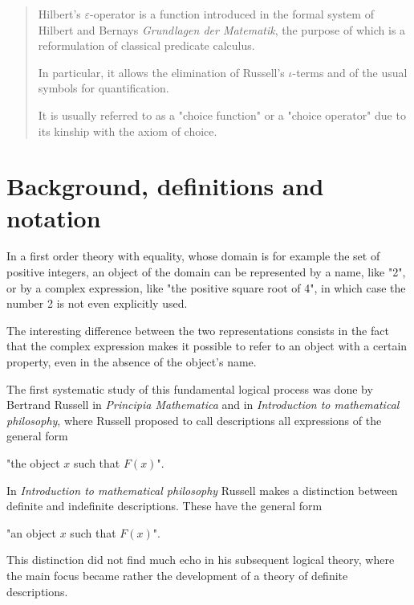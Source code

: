 \documentclass[12pt]{article}
\begin{document}
\begin{abstract}
Hilbert's $\varepsilon$-operator is a function introduced in the formal system of Hilbert and Bernays \emph{Grundlagen der Matematik}, the purpose of which is a reformulation of classical predicate calculus.

In particular, it allows the elimination of Russell's $\iota$-terms and of the usual symbols for quantification.

It is usually referred to as a "choice function" or a "choice operator" due to its kinship with the axiom of choice.
\end{abstract}

\tableofcontents

\section{Background, definitions and notation}\normalsize

In a first order theory with equality, whose domain is for example the set of positive integers, an object of the domain can be represented by a name, like "2", or by a complex expression, like "the positive square root of 4", in which case the number 2 is not even explicitly used.

The interesting difference between the two representations consists in the fact that the complex expression makes it possible to refer to an object with a certain property, even in the absence of the object's name.

The first systematic study of this fundamental logical process was done by Bertrand Russell in \emph{Principia Mathematica} and in \emph{Introduction to mathematical philosophy}, where Russell proposed to call descriptions all expressions of the general form

\begin{center}
"the object $x$ such that $F (x)$".
\end{center}

In \emph{Introduction to mathematical philosophy} Russell makes a distinction between definite and indefinite descriptions. These have the general form

\begin{center}
"an object $x$ such that $F (x)$".
\end{center}

This distinction did not find much echo in his subsequent logical theory, where the main focus became rather the development of a theory of definite descriptions.
\end{document}
